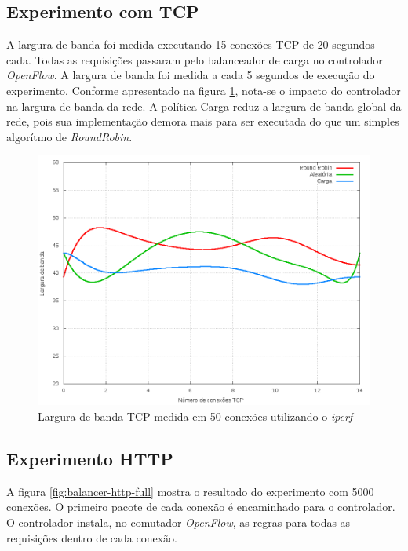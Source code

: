 \subsection{Experimento com TCP}
A largura de banda foi medida executando 15 conexões TCP de 20 segundos cada.
Todas as requisições passaram pelo balanceador de carga no controlador 
\emph{OpenFlow}.
A largura de banda foi medida a cada 5 segundos de execução do experimento.
Conforme apresentado na figura \ref{fig:balancer-tcp-bandwidth}, nota-se o 
impacto do controlador na largura de banda da rede.
A política Carga reduz a largura de banda global da rede, pois sua 
implementação demora mais para ser executada do que um simples algorítmo 
de \emph{RoundRobin}.

\begin{figure}[htb!]
    \centering
    \includegraphics[width=\linewidth]{img/balancer-tcp-bandwidth}
    \caption{Largura de banda TCP medida em 50 conexões utilizando o 
    \emph{iperf}}
    \label{fig:balancer-tcp-bandwidth}
\end{figure}

\subsection{Experimento HTTP}

A figura \ref{fig:balancer-http-full} mostra o resultado do experimento com 
5000 conexões.
O primeiro pacote de cada conexão é encaminhado para o controlador.
O controlador instala, no comutador \emph{OpenFlow}, as regras para todas 
as requisições dentro de cada conexão.

